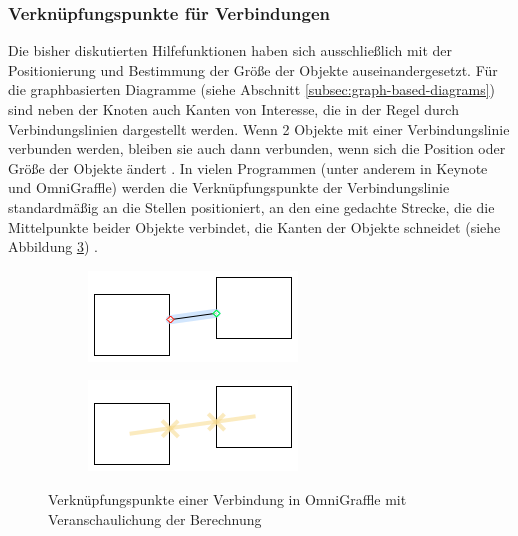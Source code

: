 \subsubsection{Verknüpfungspunkte für Verbindungen}

Die bisher diskutierten Hilfefunktionen haben sich ausschließlich mit der Positionierung und Bestimmung der Größe der Objekte auseinandergesetzt. Für die graphbasierten Diagramme (siehe Abschnitt \ref{subsec:graph-based-diagrams}) sind neben der Knoten auch Kanten von Interesse, die in der Regel durch Verbindungslinien dargestellt werden. Wenn 2 Objekte mit einer Verbindungslinie verbunden werden, bleiben sie auch dann verbunden, wenn sich die Position oder Größe der Objekte ändert \cite{11Keynote}. In vielen Programmen (unter anderem in Keynote und OmniGraffle) werden die Verknüpfungspunkte der Verbindungslinie standardmäßig an die Stellen positioniert, an den eine gedachte Strecke, die die Mittelpunkte beider Objekte verbindet, die Kanten der Objekte schneidet (siehe Abbildung \ref{fig:omnigraffle-connection-points}) \cite{08OmniGraffle}.

\begin{figure}[hbt]
    \newcommand{\subfigurewidth}{0.5\textwidth}
    \newcommand{\graphicswidth}{0.8\linewidth}
    \begin{subfigure}{\subfigurewidth}
        \centering
        \includegraphics[width=\graphicswidth]{resources/omnigraffle-connection-points-a}
        \caption{}
        \label{fig:omnigraffle-connection-points-a}
    \end{subfigure}
    \begin{subfigure}{\subfigurewidth}
        \centering
        \includegraphics[width=\graphicswidth]{resources/omnigraffle-connection-points-b}
        \caption{}
        \label{fig:omnigraffle-connection-points-b}
    \end{subfigure}
    \caption{Verknüpfungspunkte einer Verbindung in OmniGraffle  mit Veranschaulichung der Berechnung }
    \label{fig:omnigraffle-connection-points}
\end{figure}

